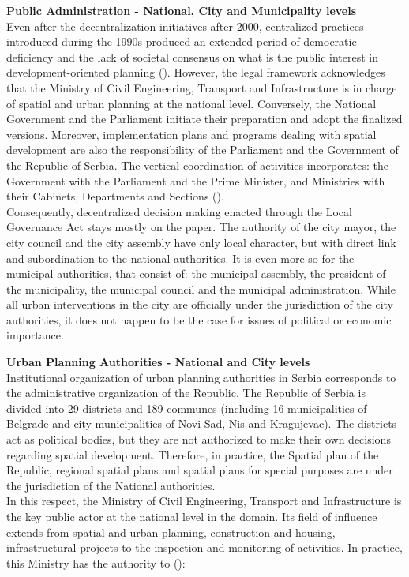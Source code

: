 \documentclass[11pt]{report}
\begin{document}
\textbf{Public Administration - National, City and Municipality levels}
\\
Even after the decentralization initiatives after 2000, centralized practices introduced during the 1990s produced an extended period of democratic deficiency and the lack of societal consensus on what is the public interest in development-oriented planning (\cite{Vujosevic 2012}).
However, the legal framework acknowledges that the Ministry of Civil Engineering, Transport and Infrastructure is in charge of spatial and urban planning at the national level.
Conversely, the National Government and the Parliament initiate their preparation and adopt the finalized versions.
Moreover, implementation plans and programs dealing with spatial development are also the responsibility of the Parliament and the Government of the Republic of Serbia.
The vertical coordination of activities incorporates: the Government with the Parliament and the Prime Minister, and Ministries with their Cabinets, Departments and Sections (\cite{Stojkov and Dobricic 2012 02}).
\\
Consequently, decentralized decision making enacted through the Local Governance Act stays mostly on the paper.
The authority of the city mayor, the city council and the city assembly have only local character, but with direct link and subordination to the national authorities.
It is even more so for the municipal authorities, that consist of: the municipal assembly, the president of the municipality, the municipal council and the municipal administration.  While all urban interventions in the city are officially under the jurisdiction of the city authorities, it does not happen to be the case for issues of political or economic importance.

\textbf{Urban Planning Authorities - National and City levels}
\\
Institutional organization of urban planning authorities in Serbia corresponds to the administrative organization of the Republic.
The Republic of Serbia is divided into 29 districts and 189 communes (including 16 municipalities of Belgrade and city municipalities of Novi Sad, Nis and Kragujevac).
The districts act as political bodies, but they are not authorized to make their own decisions regarding spatial development.
Therefore, in practice, the Spatial plan of the Republic, regional spatial plans and spatial plans for special purposes are under the jurisdiction of the National authorities.
\\
In this respect, the Ministry of Civil Engineering, Transport and Infrastructure is the key public actor at the national level in the domain.
Its field of influence extends from spatial and urban planning, construction and housing, infrastructural projects to the inspection and monitoring of activities.
In practice, this Ministry has the authority to (\cite{(Maksic 2012)}):
\end{document}
